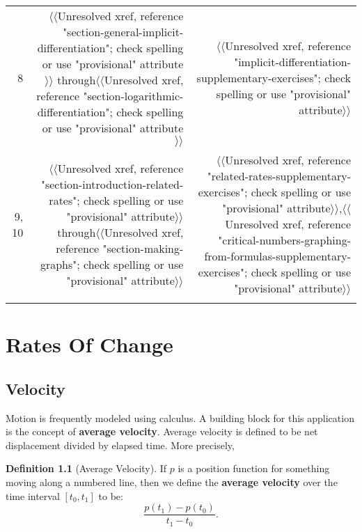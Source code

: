 \documentclass[12pt,]{book}
\newcommand{\terminology}[1]{\textbf{#1}}
\theoremstyle{plain}
\theoremstyle{definition}
\newtheorem{definition}[theorem]{Definition}
\theoremstyle{definition}
\theoremstyle{definition}
\theoremstyle{definition}
\theoremstyle{definition}
\numberwithin{equation}{section}
\newcommand{\hrulemedium}{\noalign{\hrule height 0.07em}}
\newcommand{\hrulethick} {\noalign{\hrule height 0.11em}}
\newcommand{\fe}[2]{#1\mathopen{}\left(#2\right)\mathclose{}}
\newcommand{\cinterval}[2]{\left[#1,#2\right]}
\begin{document}
\begin{table}
\begin{tabular}{r r r }
8&{$\langle\langle$Unresolved xref, reference "section-general-implicit-differentiation"; check spelling or use "provisional" attribute$\rangle\rangle$} through{$\langle\langle$Unresolved xref, reference "section-logarithmic-differentiation"; check spelling or use "provisional" attribute$\rangle\rangle$}&{$\langle\langle$Unresolved xref, reference "implicit-differentiation-supplementary-exercises"; check spelling or use "provisional" attribute$\rangle\rangle$}\tabularnewline\hrulemedium
9, 10&{$\langle\langle$Unresolved xref, reference "section-introduction-related-rates"; check spelling or use "provisional" attribute$\rangle\rangle$} through{$\langle\langle$Unresolved xref, reference "section-making-graphs"; check spelling or use "provisional" attribute$\rangle\rangle$}&{$\langle\langle$Unresolved xref, reference "related-rates-supplementary-exercises"; check spelling or use "provisional" attribute$\rangle\rangle$},{$\langle\langle$Unresolved xref, reference "critical-numbers-graphing-from-formulas-supplementary-exercises"; check spelling or use "provisional" attribute$\rangle\rangle$}\tabularnewline\hrulethick
\end{tabular}
\end{table}
\setcounter{tocdepth}{1}
\renewcommand*\contentsname{Contents}
\tableofcontents
\mainmatter
\typeout{************************************************}
\typeout{************************************************}
\chapter[{Rates Of Change}]{Rates Of Change}\label{chapter-rates-of-change}
\typeout{************************************************}
\typeout{************************************************}
\section[{Velocity}]{Velocity}\label{section-velocity}
Motion is frequently modeled using calculus. A building block for this application is the concept of \terminology{average velocity}. Average velocity is defined to be net displacement divided by elapsed time.  More precisely,%
\begin{definition}[{Average Velocity}]\label{definition-average-velocity}
If \(p\) is a position function for something moving along a numbered line, then we define the \terminology{average velocity} over the time interval \(\cinterval{t_0}{t_1}\) to be: \begin{equation*}\frac{\fe{p}{t_1}-\fe{p}{t_0}}{t_1-t_0}\text{.}\end{equation*}%
\end{definition}
\typeout{************************************************}
\typeout{************************************************}
\end{document}
